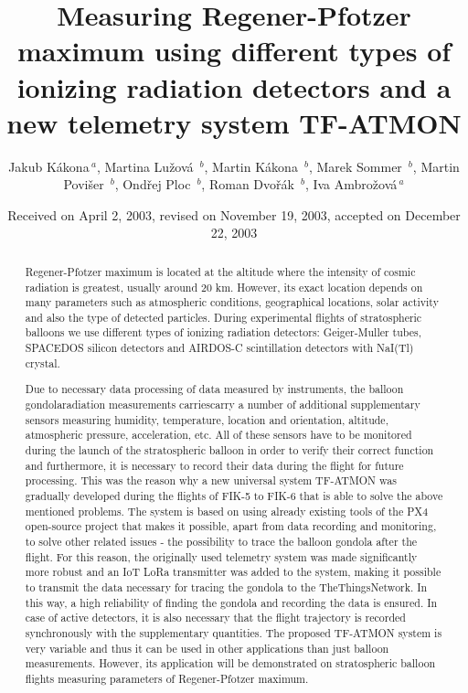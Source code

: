 \documentclass{Rpd}
\begin{document}
\def\Sectitle{Section Title}%

\def\copyrightyear{2021}%

\title[short Title]{Measuring Regener-Pfotzer maximum using different types of ionizing radiation detectors and a new telemetry system TF-ATMON}
\author[\textit{et~al}]{Jakub Kákona\,$^{ a}$,  Martina Lužová \,$^{ b}$, Martin Kákona \,$^{ b}$, Marek Sommer \,$^{ b}$, Martin Povišer \,$^{ b}$, Ondřej Ploc \,$^{ b}$, Roman Dvořák \,$^{ b}$, Iva Ambrožová\,$^{ a}$}
\address{$^{ a}$CTU - Faculty of Electrical Engineering, $^{ b}$Ústav jaderné fyziky AV ČR, v. v. i.}

\date{Received on April 2, 2003, revised on November 19, 2003, accepted on December 22, 2003}

\begin{abstract}
Regener-Pfotzer maximum is located at the altitude where the intensity of cosmic radiation is greatest, usually around 20 km. However, its exact location depends on many parameters such as atmospheric conditions, geographical locations, solar activity and also the type of detected particles. During experimental flights of stratospheric balloons we use different types of ionizing radiation detectors: Geiger-Muller tubes, SPACEDOS silicon detectors and AIRDOS-C scintillation detectors with NaI(Tl) crystal.

Due to necessary data processing of data measured by instruments, the balloon gondolaradiation measurements carriescarry a number of additional supplementary sensors measuring humidity, temperature, location and orientation, altitude, atmospheric pressure, acceleration, etc. All of these sensors have to be monitored during the launch of the stratospheric balloon in order to verify their correct function and furthermore, it is necessary to record their data during the flight for future processing. This was the reason why a new universal system TF-ATMON was gradually developed during the flights of FIK-5 to FIK-6 that is able to solve the above mentioned problems. The system is based on using already existing tools of the PX4 open-source project that makes it possible, apart from data recording and monitoring, to solve other related issues - the possibility to trace the balloon gondola after the flight. For this reason, the originally used telemetry system was made significantly more robust and an IoT LoRa transmitter was added to the system, making it possible to transmit the data necessary for tracing the gondola to the TheThingsNetwork. In this way, a high reliability of finding the gondola and recording the data is ensured. In case of active detectors, it is also necessary that the flight trajectory is recorded synchronously with the supplementary quantities.
The proposed TF-ATMON system is very variable and thus it can be used in other applications than just balloon measurements. However, its application will be demonstrated on stratospheric balloon flights measuring parameters of Regener-Pfotzer maximum.

\end{abstract}
\end{document}
